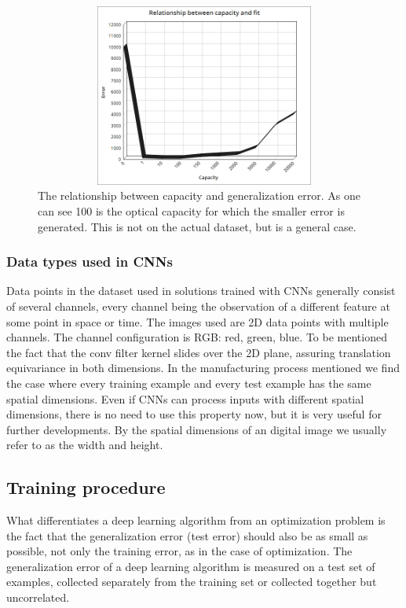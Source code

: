 \documentclass[12pt,a4paper,twoside]{report}
\begin{document}
\begin{figure}[h!]
	\centering
	\includegraphics[width=12cm, height=6cm]{img/data/chartCapacityError.png}
	\caption[]
	{The relationship between capacity and generalization error. As one can see 100 is the optical capacity for which the smaller error is generated. This is not on the actual dataset, but is a general case.}
	\label{fig:chartcapacityerror}
\end{figure}


\subsubsection{Data types used in CNNs}
Data points in the dataset used in solutions trained with CNNs generally consist of several channels, every channel being the observation of a different feature at some point in space or time. The images used are 2D data points with multiple channels. The channel configuration is RGB: red, green, blue. To be mentioned the fact that the conv filter kernel slides over the 2D plane, assuring translation equivariance in both dimensions. In the manufacturing process mentioned we find the case where every training example and every test example has the same spatial dimensions. Even if CNNs can process inputs with different spatial dimensions, there is no need to use this property now, but it is very useful for further developments. By the spatial dimensions of an digital image we usually refer to as the width and height.



\subsection{Training procedure}

What differentiates a deep learning algorithm from an optimization problem is the fact that the generalization error (test error) should also be as small as possible, not only the training error, as in the case of optimization. The generalization error of a deep learning algorithm is measured on a test set of examples, collected separately from the training set or collected together but uncorrelated.\par
\end{document}
